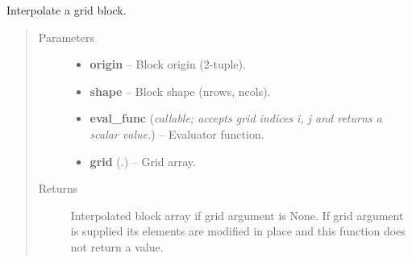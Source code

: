 \documentclass[letterpaper,10pt,english]{sphinxmanual}
\begin{document}

\begin{fulllineitems}
\label{docs/utilities:blrb.interpolate_block}
Interpolate a grid block.
\begin{quote}\begin{description}
\item[{Parameters}] \leavevmode\begin{itemize}
\item {} 
\textbf{origin} -- Block origin (2-tuple).

\item {} 
\textbf{shape} -- Block shape (nrows, ncols).

\item {} 
\textbf{eval\_func} (\emph{callable; accepts grid indices i, j and returns a scalar value.}) -- Evaluator function.

\item {} 
\textbf{grid} (.) -- Grid array.

\end{itemize}

\item[{Returns}] \leavevmode
Interpolated block array if grid argument is None. If grid argument
is supplied its elements are modified in place and this function
does not return a value.

\end{description}\end{quote}

\end{fulllineitems}


\end{document}
